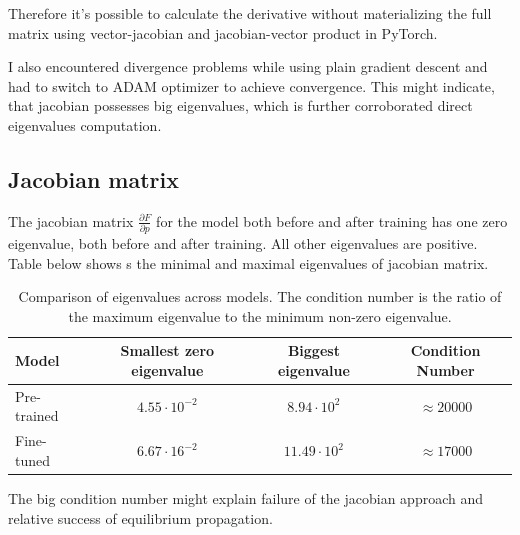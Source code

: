 \documentclass[a4paper,10.5pt]{report}
\begin{document}
Therefore it's possible to calculate the derivative without materializing the full matrix using vector-jacobian and jacobian-vector product in PyTorch.

I also encountered divergence problems while using plain gradient descent and had to switch to ADAM optimizer to achieve convergence. This might  indicate, that jacobian possesses big eigenvalues, which is further corroborated direct eigenvalues computation.
\subsection{Jacobian matrix}\label{jacmat}

The jacobian matrix $\frac{\partial F}{\partial p}$ for the model both before and after training has one zero eigenvalue, both before and after training. All other eigenvalues are positive. Table below shows s the minimal and maximal eigenvalues of jacobian matrix.

\begin{table}[htbp]
\centering
\begin{tabular}{lccc}
\hline
\textbf{Model} & \textbf{Smallest zero eigenvalue} & \textbf{Biggest eigenvalue} & \textbf{Condition Number} \\
\hline
Pre-trained & $4.55 \cdot 10^{-2}$ & $8.94 \cdot 10^2 $ & $\approx 20000$ \\
Fine-tuned     & $6.67 \cdot 16^{-2}$ & $11.49\cdot 10^{2}$ & $\approx 17000$ \\
\hline
\end{tabular}
\caption{Comparison of eigenvalues across models. The condition number is the ratio of the maximum eigenvalue to the minimum non-zero eigenvalue.}
\label{tab:eivs}

\end{table}
The big condition number might explain failure of the jacobian approach and relative success of equilibrium propagation.
\end{document}
